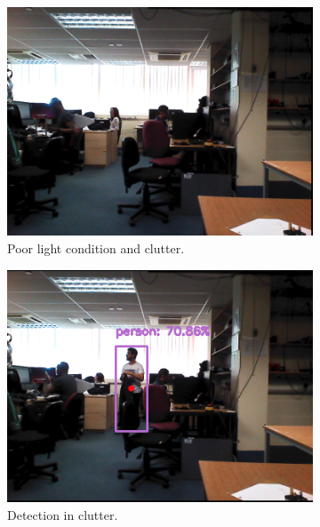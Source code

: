 \begin{figure}[H]
    \begin{subfigure}{.5\textwidth}
        \centering
        \includegraphics[width=.9\linewidth]{images/chapter6_clutter_light.png}
        \caption{Poor light condition and clutter.}
        \label{1a}
	\end{subfigure}
    \begin{subfigure}{.5\textwidth}
        \centering
        \includegraphics[width=.9\linewidth]{images/chapter6_clutter_light_detection.png}
        \caption{Detection in clutter.}
        \label{1b}
	\end{subfigure}
    \begin{subfigure}{.5\textwidth}
        \centering

\end{subfigure}
\end{figure}
